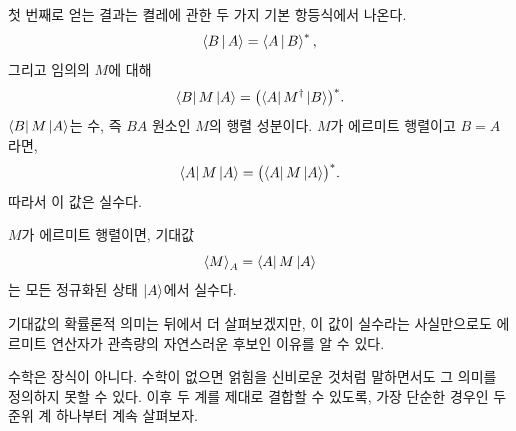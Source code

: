 첫 번째로 얻는 결과는 켤레에 관한 두 가지 기본 항등식에서 나온다. \begin{equation}
  \left\langle B\,\middle|\,A\right\rangle=\left\langle A\,\middle|\,B\right\rangle^*,
  \label{eq:l03-inner-conjugation}
\end{equation}그리고 임의의 \(M\)에 대해 \begin{equation}
  \left\langle B\right\rvert M\left\lvert A\right\rangle
  =
  \bigl(\left\langle A\right\rvert M^\dagger\left\lvert B\right\rangle\bigr)^*.
  \label{eq:l03-matrix-element-conjugation}
\end{equation}\(\left\langle B\right\rvert M\left\lvert A\right\rangle\)는 수, 즉 \(BA\) 원소인 \(M\)의 행렬 성분이다. \(M\)가 에르미트 행렬이고 \(B=A\)라면, \begin{equation}
  \left\langle A\right\rvert M\left\lvert A\right\rangle
  =
  \bigl(\left\langle A\right\rvert M\left\lvert A\right\rangle\bigr)^*.
\end{equation}따라서 이 값은 실수다.

\begin{proposition}\(M\)가 에르미트 행렬이면, 기대값 \begin{equation}
  \left\langle M\right\rangle_A=\left\langle A\right\rvert M\left\lvert A\right\rangle
  \label{eq:l03-expectation}
\end{equation}는 모든 정규화된 상태 \(\left\lvert A\right\rangle\)에서 실수다.\end{proposition}

기대값의 확률론적 의미는 뒤에서 더 살펴보겠지만, 이 값이 실수라는 사실만으로도 에르미트 연산자가 관측량의 자연스러운 후보인 이유를 알 수 있다.

\begin{classroomqa}\end{classroomqa}

\begin{classroomqa}\end{classroomqa}

수학은 장식이 아니다. 수학이 없으면 얽힘을 신비로운 것처럼 말하면서도 그 의미를 정의하지 못할 수 있다. 이후 두 계를 제대로 결합할 수 있도록, 가장 단순한 경우인 두 준위 계 하나부터 계속 살펴보자.

